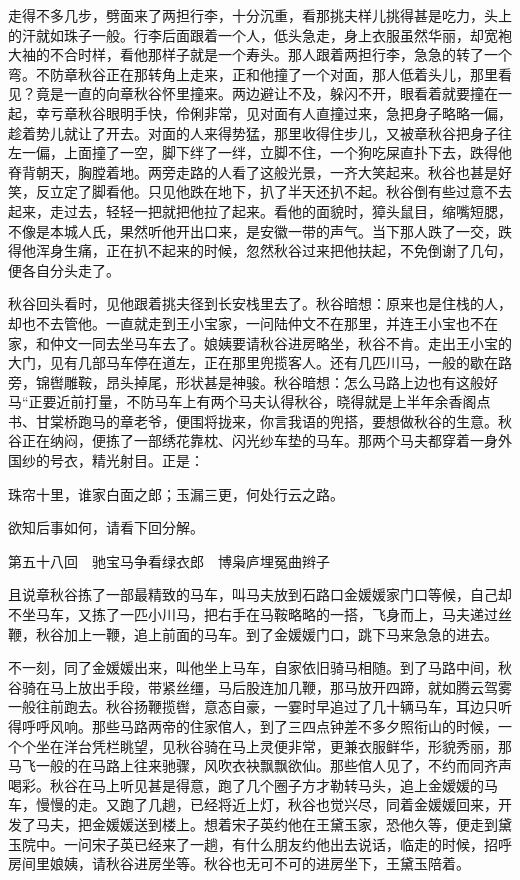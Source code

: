 \documentclass[12pt,UTF8]{ctexbook}
\begin{document}
{{{走得不多几步，劈面来了两担行李，十分沉重，看那挑夫样儿挑得甚是吃力，头上的汗就如珠子一般。行李后面跟着一个人，低头急走，身上衣服虽然华丽，却宽袍大袖的不合时样，看他那样子就是一个寿头。那人跟着两担行李，急急的转了一个弯。不防章秋谷正在那转角上走来，正和他撞了一个对面，那人低着头儿，那里看见？竟是一直的向章秋谷怀里撞来。两边避让不及，躲闪不开，眼看着就要撞在一起，幸亏章秋谷眼明手快，伶俐非常，见对面有人直撞过来，急把身子略略一偏，趁着势儿就让了开去。对面的人来得势猛，那里收得住步儿，又被章秋谷把身子往左一偏，上面撞了一空，脚下绊了一绊，立脚不住，一个狗吃屎直扑下去，跌得他脊背朝天，胸膛着地。两旁走路的人看了这般光景，一齐大笑起来。秋谷也甚是好笑，反立定了脚看他。只见他跌在地下，扒了半天还扒不起。秋谷倒有些过意不去起来，走过去，轻轻一把就把他拉了起来。看他的面貌时，獐头鼠目，缩嘴短腮，不像是本城人氏，果然听他开出口来，是安徽一带的声气。当下那人跌了一交，跌得他浑身生痛，正在扒不起来的时候，忽然秋谷过来把他扶起，不免倒谢了几句，便各自分头走了。

秋谷回头看时，见他跟着挑夫径到长安栈里去了。秋谷暗想：原来也是住栈的人，却也不去管他。一直就走到王小宝家，一问陆仲文不在那里，并连王小宝也不在家，和仲文一同去坐马车去了。娘姨要请秋谷进房略坐，秋谷不肯。走出王小宝的大门，见有几部马车停在道左，正在那里兜揽客人。还有几匹川马，一般的歇在路旁，锦辔雕鞍，昂头掉尾，形状甚是神骏。秋谷暗想：怎么马路上边也有这般好马“正要近前打量，不防马车上有两个马夫认得秋谷，晓得就是上半年余香阁点书、甘棠桥跑马的章老爷，便围将拢来，你言我语的兜搭，要想做秋谷的生意。秋谷正在纳闷，便拣了一部绣花靠枕、闪光纱车垫的马车。那两个马夫都穿着一身外国纱的号衣，精光射目。正是：

珠帘十里，谁家白面之郎；玉漏三更，何处行云之路。

欲知后事如何，请看下回分解。





第五十八回　驰宝马争看绿衣郎　博枭庐埋冤曲辫子





且说章秋谷拣了一部最精致的马车，叫马夫放到石路口金媛媛家门口等候，自己却不坐马车，又拣了一匹小川马，把右手在马鞍略略的一搭，飞身而上，马夫递过丝鞭，秋谷加上一鞭，追上前面的马车。到了金媛媛门口，跳下马来急急的进去。

不一刻，同了金媛媛出来，叫他坐上马车，自家依旧骑马相随。到了马路中间，秋谷骑在马上放出手段，带紧丝缰，马后股连加几鞭，那马放开四蹄，就如腾云驾雾一般往前跑去。秋谷扬鞭揽辔，意态自豪，一霎时早追过了几十辆马车，耳边只听得呼呼风响。那些马路两帝的住家倌人，到了三四点钟差不多夕照衔山的时候，一个个坐在洋台凭栏眺望，见秋谷骑在马上灵便非常，更兼衣服鲜华，形貌秀丽，那马飞一般的在马路上往来驰骤，风吹衣袂飘飘欲仙。那些倌人见了，不约而同齐声喝彩。秋谷在马上听见甚是得意，跑了几个圈子方才勒转马头，追上金嫒媛的马车，慢慢的走。又跑了几趟，已经将近上灯，秋谷也觉兴尽，同着金媛媛回来，开发了马夫，把金媛媛送到楼上。想着宋子英约他在王黛玉家，恐他久等，便走到黛玉院中。一问宋子英已经来了一趟，有什么朋友约他出去说话，临走的时候，招呼房间里娘姨，请秋谷进房坐等。秋谷也无可不可的进房坐下，王黛玉陪着。

}}}
\end{document}
